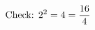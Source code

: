 \documentclass[preview]{standalone}
\begin{document}
\begin{align*}
\special{dvisvgm:raw <g id='unique000'>}\text{Check: } 2^2 = 4 = \frac{16}{4}\special{dvisvgm:raw </g>}
\end{align*}
\end{document}
